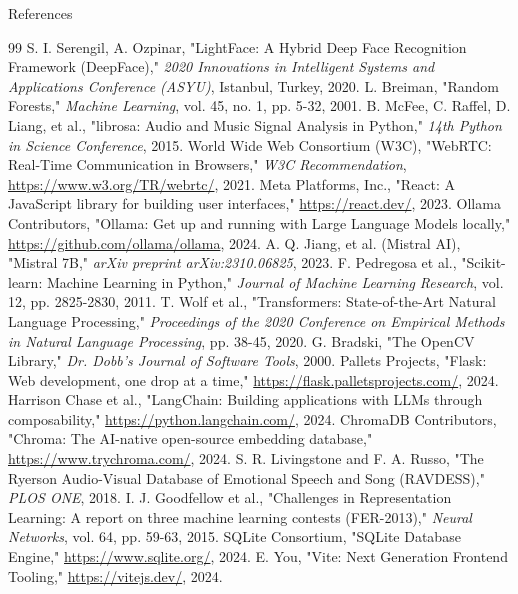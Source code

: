 \documentclass[11pt]{beamer}
\begin{document}
\begin{frame}[allowframebreaks]{References}
\begin{thebibliography}{99}
     S. I. Serengil, A. Ozpinar, "LightFace: A Hybrid Deep Face Recognition Framework (DeepFace)," \textit{2020 Innovations in Intelligent Systems and Applications Conference (ASYU)}, Istanbul, Turkey, 2020.
     L. Breiman, "Random Forests," \textit{Machine Learning}, vol. 45, no. 1, pp. 5-32, 2001.
     B. McFee, C. Raffel, D. Liang, et al., "librosa: Audio and Music Signal Analysis in Python," \textit{14th Python in Science Conference}, 2015.
     World Wide Web Consortium (W3C), "WebRTC: Real-Time Communication in Browsers," \textit{W3C Recommendation}, \url{https://www.w3.org/TR/webrtc/}, 2021.
     Meta Platforms, Inc., "React: A JavaScript library for building user interfaces," \url{https://react.dev/}, 2023.
     Ollama Contributors, "Ollama: Get up and running with Large Language Models locally," \url{https://github.com/ollama/ollama}, 2024.
     A. Q. Jiang, et al. (Mistral AI), "Mistral 7B," \textit{arXiv preprint arXiv:2310.06825}, 2023.
     F. Pedregosa et al., "Scikit-learn: Machine Learning in Python," \textit{Journal of Machine Learning Research}, vol. 12, pp. 2825-2830, 2011.
     T. Wolf et al., "Transformers: State-of-the-Art Natural Language Processing," \textit{Proceedings of the 2020 Conference on Empirical Methods in Natural Language Processing}, pp. 38-45, 2020.
     G. Bradski, "The OpenCV Library," \textit{Dr. Dobb's Journal of Software Tools}, 2000.
     Pallets Projects, "Flask: Web development, one drop at a time," \url{https://flask.palletsprojects.com/}, 2024.
     Harrison Chase et al., "LangChain: Building applications with LLMs through composability," \url{https://python.langchain.com/}, 2024.
     ChromaDB Contributors, "Chroma: The AI-native open-source embedding database," \url{https://www.trychroma.com/}, 2024.
     S. R. Livingstone and F. A. Russo, "The Ryerson Audio-Visual Database of Emotional Speech and Song (RAVDESS)," \textit{PLOS ONE}, 2018.
     I. J. Goodfellow et al., "Challenges in Representation Learning: A report on three machine learning contests (FER-2013)," \textit{Neural Networks}, vol. 64, pp. 59-63, 2015.
     SQLite Consortium, "SQLite Database Engine," \url{https://www.sqlite.org/}, 2024.
     E. You, "Vite: Next Generation Frontend Tooling," \url{https://vitejs.dev/}, 2024.

    \end{thebibliography}
\end{frame}
\end{document}
